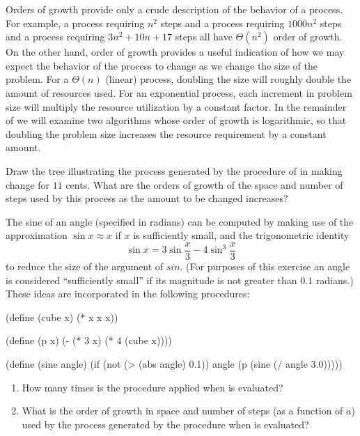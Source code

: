Orders of growth provide only a crude description of the behavior of a process.
For example, a process requiring \( n^2 \) steps and a process requiring \( 1000 n^2 \) steps and a process requiring \( 3 n^2 + 10 n + 17 \) steps all have \( Θ(n^2) \) order of growth.
On the other hand, order of growth provides a useful indication of how we may expect the behavior of the process to change as we change the size of the problem.
For a \( Θ(n) \) (linear) process, doubling the size will roughly double the amount of resources used.
For an exponential process, each increment in problem size will multiply the resource utilization by a constant factor.
In the remainder of  we will examine two algorithms whose order of growth is logarithmic, so that doubling the problem size increases the resource requirement by a constant amount.



\begin{exercise}
	\label{Exercise 1.14}
	Draw the tree illustrating the process generated by the  procedure of  in making change for \( 11 \) cents.
	What are the orders of growth of the space and number of steps used by this process as the amount to be changed increases?
\end{exercise}



\begin{exercise}
	\label{Exercise 1.15}
	The sine of an angle (specified in radians) can be computed by making use of the approximation \( \sin x \approx x \) if \( x \) is sufficiently small, and the trigonometric identity
	\[
		\sin x = 3 \sin \frac{x}{3} - 4 \sin^3 \frac{x}{3}
	\]
	to reduce the size of the argument of \( sin \).
	(For purposes of this exercise an angle is considered “sufficiently small” if its magnitude is not greater than \( 0.1 \) radians.)
	These ideas are incorporated in the following procedures:
	\begin{scheme}
	  (define (cube x) (* x x x))

	  (define (p x) (- (* 3 x) (* 4 (cube x))))

	  (define (sine angle)
	    (if (not (> (abs angle) 0.1))
	        angle
	        (p (sine (/ angle 3.0)))))
	\end{scheme}
	\begin{enumerate}[label = \alph*., leftmargin = *]

		\item
			How many times is the procedure  applied when  is evaluated?

		\item
			What is the order of growth in space and number of steps (as a function of \( a \)) used by the process generated by the  procedure when  is evaluated?

	\end{enumerate}
\end{exercise}
